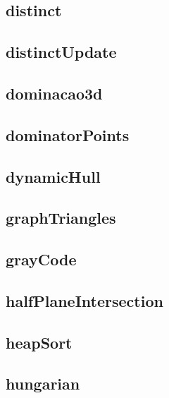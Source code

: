 \subsection{distinct}
\raggedbottom
\hrulefill
\subsection{distinctUpdate}
\raggedbottom
\hrulefill
\subsection{dominacao3d}
\raggedbottom
\hrulefill
\subsection{dominatorPoints}
\raggedbottom
\hrulefill
\subsection{dynamicHull}
\raggedbottom
\hrulefill
\subsection{graphTriangles}
\raggedbottom
\hrulefill
\subsection{grayCode}
\raggedbottom
\hrulefill
\subsection{halfPlaneIntersection}
\raggedbottom
\hrulefill
\subsection{heapSort}
\raggedbottom
\hrulefill
\subsection{hungarian}
\raggedbottom
\hrulefill
